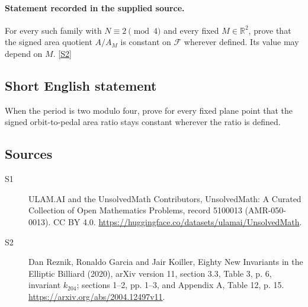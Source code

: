 \documentclass[11pt]{article}
\newcommand{\sref}[2]{\hyperlink{source:#1:#2}{[S#2]}}
\begin{document}
\paragraph{Statement recorded in the supplied source.}
For every such family with $N\equiv2\pmod4$ and every fixed $M\in\mathbb R^2$, prove that the signed area quotient $A/A_M$ is constant on $\mathcal F$ wherever defined. Its value may depend on $M$. \sref{5100013}{2}
\subsection{Short English statement}
When the period is two modulo four, prove for every fixed plane point that the signed orbit-to-pedal area ratio stays constant wherever the ratio is defined.
\subsection{Sources}
\begin{description}
\item[\hypertarget{source:5100013:1}{S1}] ULAM.AI and the UnsolvedMath Contributors, UnsolvedMath: A Curated Collection of Open Mathematics Problems, record 5100013 (AMR-050-0013). CC BY 4.0. \url{https://huggingface.co/datasets/ulamai/UnsolvedMath}.
\item[\hypertarget{source:5100013:2}{S2}] Dan Reznik, Ronaldo Garcia and Jair Koiller, Eighty New Invariants in the Elliptic Billiard (2020), arXiv version 11, section 3.3, Table 3, p. 6, invariant $k_{204}$; sections 1--2, pp. 1--3, and Appendix A, Table 12, p. 15. \url{https://arxiv.org/abs/2004.12497v11}.
\end{description}
\label{end:5100013}
\end{document}
